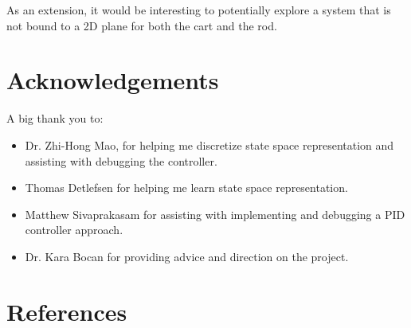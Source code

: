 \documentclass{article}
\begin{document}
As an extension, it would be interesting to potentially explore a system that is not bound to a 2D plane for both the cart and the rod.

\section{Acknowledgements}
\noindent A big thank you to:
\begin{itemize}
    \item Dr. Zhi-Hong Mao, for helping me discretize state space representation and assisting with debugging the controller.
    \item Thomas Detlefsen for helping me learn state space representation.
    \item Matthew Sivaprakasam for assisting with implementing and debugging a PID controller approach.
    \item Dr. Kara Bocan for providing advice and direction on the project.
\end{itemize}


\section{References}
\end{document}
